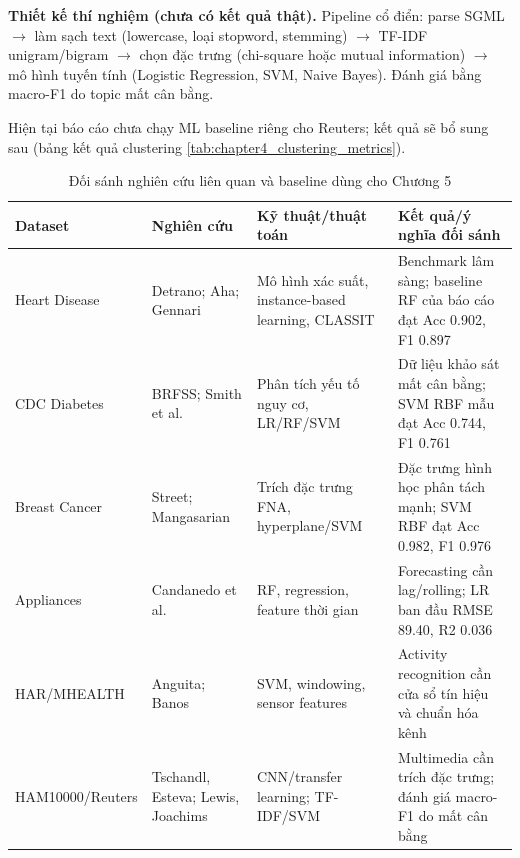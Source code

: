 \textbf{Thiết kế thí nghiệm (chưa có kết quả thật).} Pipeline cổ điển: parse SGML $\to$ làm sạch text (lowercase, loại stopword, stemming) $\to$ TF-IDF unigram/bigram $\to$ chọn đặc trưng (chi-square hoặc mutual information) $\to$ mô hình tuyến tính (Logistic Regression, SVM, Naive Bayes). Đánh giá bằng macro-F1 do topic mất cân bằng.

Hiện tại báo cáo chưa chạy ML baseline riêng cho Reuters; kết quả sẽ bổ sung sau (bảng kết quả clustering \ref{tab:chapter4_clustering_metrics}).

\begin{table}[H]
\centering
\caption{Đối sánh nghiên cứu liên quan và baseline dùng cho Chương 5}
\label{tab:chapter2_research_benchmark}
\small
\begin{tabular}{p{}p{}p{}p{}}
\toprule
Dataset & Nghiên cứu & Kỹ thuật/thuật toán & Kết quả/ý nghĩa đối sánh \\
\midrule
Heart Disease & Detrano; Aha; Gennari & Mô hình xác suất, instance-based learning, CLASSIT & Benchmark lâm sàng; baseline RF của báo cáo đạt Acc 0.902, F1 0.897 \\
CDC Diabetes & BRFSS; Smith et al. & Phân tích yếu tố nguy cơ, LR/RF/SVM & Dữ liệu khảo sát mất cân bằng; SVM RBF mẫu đạt Acc 0.744, F1 0.761 \\
Breast Cancer & Street; Mangasarian & Trích đặc trưng FNA, hyperplane/SVM & Đặc trưng hình học phân tách mạnh; SVM RBF đạt Acc 0.982, F1 0.976 \\
Appliances & Candanedo et al. & RF, regression, feature thời gian & Forecasting cần lag/rolling; LR ban đầu RMSE 89.40, R2 0.036 \\
HAR/MHEALTH & Anguita; Banos & SVM, windowing, sensor features & Activity recognition cần cửa sổ tín hiệu và chuẩn hóa kênh \\
HAM10000/Reuters & Tschandl, Esteva; Lewis, Joachims & CNN/transfer learning; TF-IDF/SVM & Multimedia cần trích đặc trưng; đánh giá macro-F1 do mất cân bằng \\
\bottomrule
\end{tabular}
\end{table}

